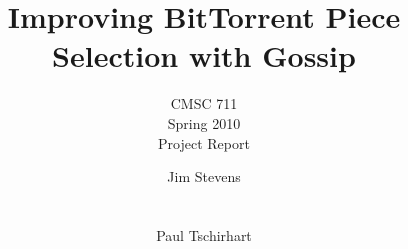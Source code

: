 \documentclass[twocolumn]{sig-alternate}
\begin{document}
\title{Improving BitTorrent Piece Selection with Gossip}

\subtitle{CMSC 711 \\ Spring 2010 \\ Project Report}

\author{ 
\alignauthor
Jim Stevens\\
	\\
	\\
\alignauthor
Paul Tschirhart\\
	\\
}

\maketitle














\end{document}
